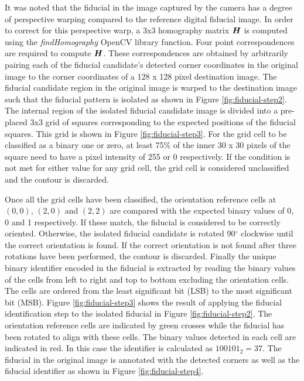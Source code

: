 It was noted that the fiducial in the image captured by the camera has a degree of perspective warping compared to the reference digital fiducial image. In order to correct for this perspective warp, a 3x3 homography matrix $\bm{H}$ is computed using the \textit{findHomography} OpenCV library function. Four point correspondences are required to compute $\bm{H}$. These correspondences are obtained by arbitrarily pairing each of the fiducial candidate's detected corner coordinates in the original image to the corner coordinates of a 128 x 128 pixel destination image. The fiducial candidate region in the original image is warped to the destination image such that the fiducial pattern is isolated as shown in Figure \ref{fig:fiducial-step2}. The internal region of the isolated fiducial candidate image is divided into a pre-placed 3x3 grid of squares corresponding to the expected positions of the fiducial squares. This grid is shown in Figure \ref{fig:fiducial-step3}. For the grid cell to be classified as a binary one or zero, at least 75\% of the inner 30 x 30 pixels of the square need to have a pixel intensity of 255 or 0 respectively. If the condition is not met for either value for any grid cell, the grid cell is considered unclassified and the contour is discarded.

Once all the grid cells have been classified, the orientation reference cells at $(0, 0)$, $(2, 0)$ and $(2,2)$ are compared with the expected binary values of 0, 0 and 1 respectively. If these match, the fiducial is considered to be correctly oriented. Otherwise, the isolated fiducial candidate is rotated 90$^{\circ}$ clockwise until the correct orientation is found. If the correct orientation is not found after three rotations have been performed, the contour is discarded. Finally the unique binary identifier encoded in the fiducial is extracted by reading the binary values of the cells from left to right and top to bottom excluding the orientation cells. The cells are ordered from the least significant bit (LSB) to the most significant bit (MSB). Figure \ref{fig:fiducial-step3} shows the result of applying the fiducial identification step to the isolated fiducial in Figure \ref{fig:fiducial-step2}. The orientation reference cells are indicated by green crosses while the fiducial has been rotated to align with these cells. The binary values detected in each cell are indicated in red. In this case the identifier is calculated as $100101_2=37$. The fiducial in the original image is annotated with the detected corners as well as the fiducial identifier as shown in Figure \ref{fig:fiducial-step4}.


